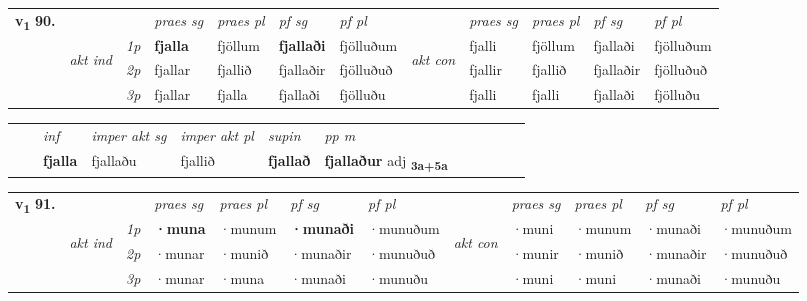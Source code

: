 \begin{tabular}{llllllllllll} \toprule
\multirow{4}{*}{{{\textbf{v{\textsubscript{1}}} \Large{\textbf{90.}}}}}  & &   &  \textit{praes sg}  & \textit{praes pl}  &\textit{ pf sg} & \textit{pf pl} &  &  \textit{praes sg}  & \textit{praes pl}  & \textit{pf sg} & \textit{pf pl } \\*
	\cmidrule{4-7} \cmidrule{9-12}
 & \multirow{3}{*}{\begin{turn}{90}\textit{akt ind}\end{turn}} & {\textit{1p}} & \textbf{fjalla} & fjöllum    & \textbf{fjallaði} & fjölluðum & \multirow{3}{*}{\begin{turn}{90}\textit{akt con}\end{turn}} &fjalli & fjöllum & fjallaði & fjölluðum\\*
& &  {\textit{2p}} &  fjallar  & fjallið   & fjallaðir & fjölluðuð & & fjallir & fjallið & fjallaðir & fjölluðuð \\*
& &  {\textit{3p}} & fjallar & fjalla   & fjallaði & fjölluðu & & fjalli & fjalli& fjallaði & fjölluðu  \\*
\cmidrule{4-7} \cmidrule{9-12}
\end{tabular}


\begin{tabular}{llllllllllll}
 & & \textit{inf} & \textit{imper akt sg} & \textit{imper akt pl}    & \textit{supin}  & \textit{pp m}     \\*
  & & \textbf{fjalla} & fjallaðu  & fjallið    &  \textbf{fjallað}  & \textbf{fjallaður} adj \textbf{\textsubscript{3a+5a}} \\*
\cmidrule{1-12}
\end{tabular}



\begin{tabular}{llllllllllll} \toprule
\multirow{4}{*}{{{\textbf{v{\textsubscript{1}}} \Large{\textbf{91.}}}}}  & &   &  \textit{praes sg}  & \textit{praes pl}  &\textit{ pf sg} & \textit{pf pl} &  &  \textit{praes sg}  & \textit{praes pl}  & \textit{pf sg} & \textit{pf pl } \\*
	\cmidrule{4-7} \cmidrule{9-12}
 & \multirow{3}{*}{\begin{turn}{90}\textit{akt ind}\end{turn}} & {\textit{1p}} & \textbf{·muna} & ·munum    & \textbf{·munaði} & ·munuðum & \multirow{3}{*}{\begin{turn}{90}\textit{akt con}\end{turn}} &·muni & ·munum & ·munaði & ·munuðum\\*
& &  {\textit{2p}} &  ·munar  & ·munið   & ·munaðir & ·munuðuð & & ·munir & ·munið & ·munaðir & ·munuðuð \\*
& &  {\textit{3p}} & ·munar & ·muna   & ·munaði & ·munuðu & & ·muni & ·muni& ·munaði & ·munuðu  \\*
\cmidrule{4-7} \cmidrule{9-12}
\end{tabular}


